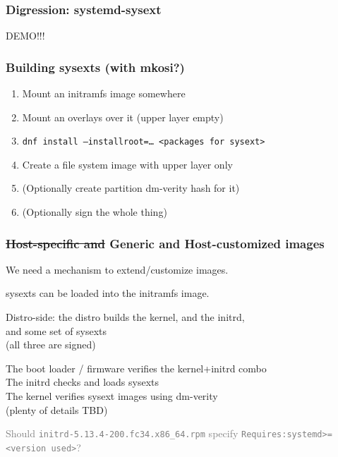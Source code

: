 \documentclass[]{beamer}
\begin{document}
\begin{frame}
  \frametitle{Digression: systemd-sysext}

  DEMO!!!

\end{frame}

\begin{frame}
  \frametitle{Building sysexts (with mkosi?)}

  \begin{enumerate}
  \item Mount an initramfs image somewhere
  \item Mount an overlays over it (upper layer empty)
  \item \texttt{dnf install --installroot=… <packages for sysext>}
  \item Create a file system image with upper layer only
  \item (Optionally create partition dm-verity hash for it)
  \item (Optionally sign the whole thing)
  \end{enumerate}
\end{frame}

\begin{frame}
  \frametitle{\sout{Host-specific and }Generic and Host-customized images}

  We need a mechanism to extend/customize images.

  \bigskip
  \pause

  sysexts can be loaded into the initramfs image.

  \bigskip
  \pause

  Distro-side: the distro builds the kernel, and the initrd,\\
  \phantom{Distro-side: }and some set of sysexts\\
  \phantom{Distro-side: }(all three are signed)\\

  \pause

  The boot loader / firmware verifies the kernel+initrd combo\\
  The initrd checks and loads sysexts\\
  The kernel verifies sysext images using dm-verity\\
  (plenty of details TBD)

  \vfill

  \textcolor{gray}{Should \texttt{initrd-5.13.4-200.fc34.x86\_64.rpm} specify \texttt{Requires:systemd>=<version used>}?}
\end{frame}
\end{document}
